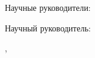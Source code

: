 %
\vspace{0pt plus4fill} %
\begin{flushright}
\ifdefined\supervisorTwoFio
Научные руководители:

\supervisorRegalia

\ifdefined\supervisorDead
\framebox{\supervisorFio}
\else
\supervisorFio
\fi

\supervisorTwoRegalia

\ifdefined\supervisorTwoDead
\framebox{\supervisorTwoFio}
\else
\supervisorTwoFio
\fi
\else
Научный руководитель:

\supervisorRegaliaShort

\ifdefined\supervisorDead
\framebox{\supervisorFio}
\else
\supervisorFio
\fi
\fi

\end{flushright}
%
\vspace{0pt plus4fill} %
{\centering\thesisCity,  \thesisYear\par}
